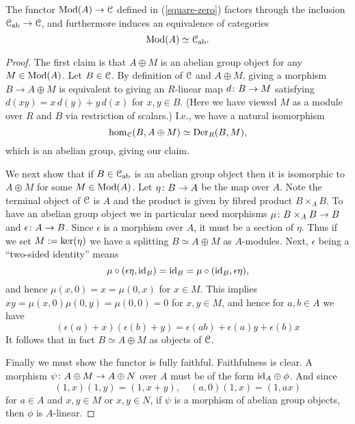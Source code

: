 \begin{proposition}
  \label{modules-abelian}
  The functor $\mathrm{Mod}(A) \to \mathcal{C}$ defined in (\ref{square-zero}) factors
  through the inclusion $\mathcal{C}_{\mathrm{ab}} \to \mathcal{C}$, and furthermore induces an
  equivalence of categories
  \[
  \mathrm{Mod}(A) \simeq \mathcal{C}_{\mathrm{ab}}.
  \]
\end{proposition}

\begin{proof}
  The first claim is that $A \oplus M$ is an abelian group object for
  any $M \in \mathrm{Mod}(A)$. Let $B \in \mathcal{C}$. By definition of $\mathcal{C}$ and $A
  \oplus M$, giving a morphism $B \to A \oplus M$ is equivalent to
  giving an $R$-linear map $d \colon B \to M$ satisfying $d(xy) = x\,d(y) +
  y\,d(x)$ for $x,y \in B$. (Here we have viewed $M$ as a module over
  $R$ and $B$ via restriction of scalars.) I.e., we have a natural
  isomorphism
  \begin{equation}
    \label{sqzero-der}
    \operatorname{hom}_{\mathcal{C}}(B, A \oplus M) \simeq \operatorname{Der}_R(B,M),
  \end{equation}
  which is an abelian group, giving our claim.

  We next show that if $B \in \mathcal{C}_{\mathrm{ab}}$ is an abelian group object
  then it is isomorphic to $A \oplus M$ for some $M \in \mathrm{Mod}(A)$. Let
  $\eta \colon B \to A$ be the map over $A$. Note the terminal object of
  $\mathcal{C}$ is $A$ and the product is given by fibred product $B \times_A
  B$. To have an abelian group object we in particular need morphisms
  $\mu \colon B \times_A B \to B$ and $\epsilon \colon A \to B$.  Since
  $\epsilon$ is a morphism over $A$, it must be a section of
  $\eta$. Thus if we set $M \mathrel{:=} \operatorname{ker}(\eta)$ we have a splitting
  $B \simeq A \oplus M$ as $A$-modules. Next, $\epsilon$ being a
  ``two-sided identity'' means
  \[
  \mu \circ (\epsilon \eta, \mathrm{id}_B) = \mathrm{id}_B = \mu \circ (\mathrm{id}_B,
  \epsilon \eta),
  \]
  and hence $\mu(x,0) = x = \mu(0,x)$ for $x \in M$. This implies $xy
  = \mu(x,0)\mu(0,y) = \mu(0,0) = 0$ for $x,y \in M$, and hence for
  $a,b \in A$ we have
  \[
  (\epsilon(a)+x)(\epsilon(b)+y) = \epsilon(ab) + \epsilon(a)y +
  \epsilon(b)x
  \]
  It follows that in fact $B \simeq A \oplus M$ as objects of $\mathcal{C}$.

  Finally we must show the functor is fully faithful. Faithfulness is
  clear. A morphism $\psi \colon A \oplus M \to A \oplus N$ over $A$ must
  be of the form $\mathrm{id}_A \oplus \phi$. And since
  \[
  (1,x)(1,y) = (1,x+y), \quad (a,0)(1,x) = (1,ax)
  \]
  for $a \in A$ and $x,y \in M$ or $x,y \in N$, if $\psi$ is a
  morphism of abelian group objects, then $\phi$ is $A$-linear.
\end{proof}

